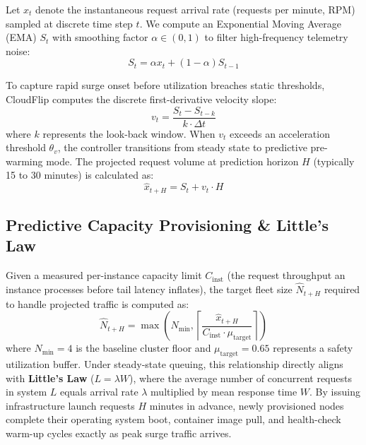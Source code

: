 \documentclass[10pt,journal,compsoc]{IEEEtran}
\begin{document}
Let $x_t$ denote the instantaneous request arrival rate (requests per minute, RPM) sampled at discrete time step $t$. We compute an Exponential Moving Average (EMA) $S_t$ with smoothing factor $\alpha \in (0, 1)$ to filter high-frequency telemetry noise:
\begin{equation}
S_t = \alpha x_t + (1 - \alpha) S_{t-1}
\end{equation}

To capture rapid surge onset before utilization breaches static thresholds, CloudFlip computes the discrete first-derivative velocity slope:
\begin{equation}
v_t = \frac{S_t - S_{t-k}}{k \cdot \Delta t}
\end{equation}
where $k$ represents the look-back window. When $v_t$ exceeds an acceleration threshold $\theta_v$, the controller transitions from steady state to predictive pre-warming mode. The projected request volume at prediction horizon $H$ (typically 15 to 30 minutes) is calculated as:
\begin{equation}
\hat{x}_{t+H} = S_t + v_t \cdot H
\end{equation}

\subsection{Predictive Capacity Provisioning \& Little's Law}
Given a measured per-instance capacity limit $C_{\text{inst}}$ (the request throughput an instance processes before tail latency inflates), the target fleet size $\hat{N}_{t+H}$ required to handle projected traffic is computed as:
\begin{equation}
\hat{N}_{t+H} = \max\left( N_{\min}, \left\lceil \frac{\hat{x}_{t+H}}{C_{\text{inst}} \cdot \mu_{\text{target}}} \right\rceil \right)
\end{equation}
where $N_{\min} = 4$ is the baseline cluster floor and $\mu_{\text{target}} = 0.65$ represents a safety utilization buffer. Under steady-state queuing, this relationship directly aligns with \textbf{Little's Law} ($L = \lambda W$), where the average number of concurrent requests in system $L$ equals arrival rate $\lambda$ multiplied by mean response time $W$. By issuing infrastructure launch requests $H$ minutes in advance, newly provisioned nodes complete their operating system boot, container image pull, and health-check warm-up cycles exactly as peak surge traffic arrives.
\end{document}
